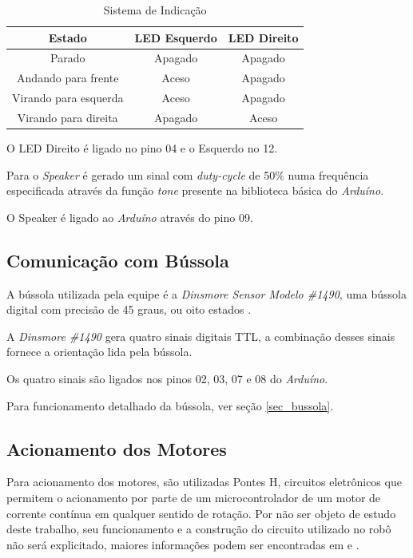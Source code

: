 \begin{table}[h!]
    \centering
    \begin{tabular}{|c|c|c|} \hline
        \textbf{Estado} & \textbf{LED Esquerdo} & \textbf{LED Direito} \\ \hline
        Parado & Apagado & Apagado \\ \hline
        Andando para frente & Aceso & Apagado \\ \hline
        Virando para esquerda & Aceso & Apagado \\ \hline
        Virando para direita & Apagado & Aceso \\ \hline
    \end{tabular}
    \caption{Sistema de Indicação}
    \label{int_tbl01}
\end{table}

O LED Direito é ligado no pino 04 e o Esquerdo no 12.

Para o \textit{Speaker} é gerado um sinal com \textit{duty-cycle} de 50\% numa frequência especificada através da função \textit{tone} presente na biblioteca básica do \textit{Arduíno}.

O Speaker é ligado ao \textit{Arduíno} através do pino 09.

\subsection{Comunicação com Bússola}

A bússola utilizada pela equipe é a \textit{Dinsmore Sensor Modelo \#1490}, uma bússola digital com precisão de 45 graus, ou oito estados \cite{bussola}.

A \textit{Dinsmore \#1490} gera quatro sinais digitais TTL, a combinação desses sinais fornece a orientação lida pela bússola.

Os quatro sinais são ligados nos pinos 02, 03, 07 e 08 do \textit{Arduíno}.

Para funcionamento detalhado da bússola, ver seção \ref{sec_bussola}.

\subsection{Acionamento dos Motores}
\label{sec_com_motores}

Para acionamento dos motores, são utilizadas Pontes H, circuitos eletrônicos que permitem o acionamento por parte de um microcontrolador de um motor de corrente contínua em qualquer sentido de rotação. Por não ser objeto de estudo deste trabalho, seu funcionamento e a construção do circuito utilizado no robô não será explicitado, maiores informações podem ser encontradas em \cite{Robo2d} e \cite{ponteh}. 

